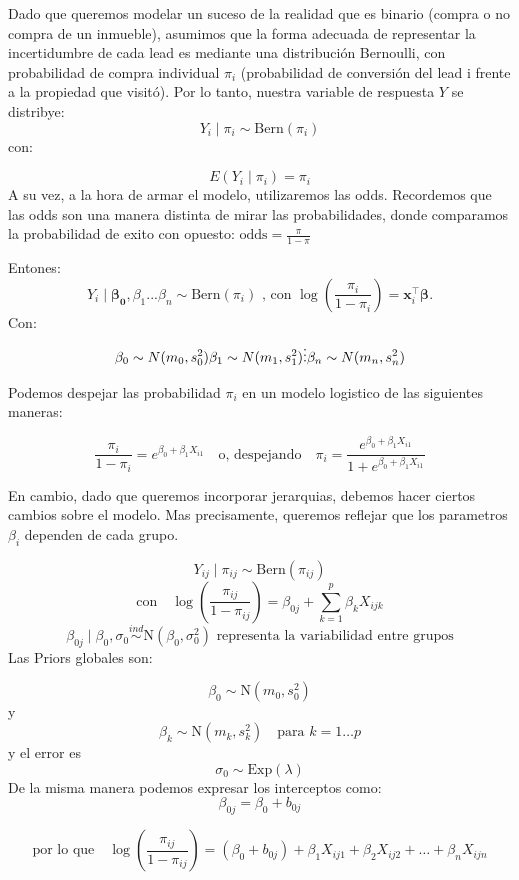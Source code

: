 \documentclass[
  letterpaper,
  DIV=11,
  numbers=noendperiod]{scrartcl}
\begin{document}
Dado que queremos modelar un suceso de la realidad que es binario
(compra o no compra de un inmueble), asumimos que la forma adecuada de
representar la incertidumbre de cada lead es mediante una distribución
Bernoulli, con probabilidad de compra individual \(\pi_i\) (probabilidad
de conversión del lead i frente a la propiedad que visitó). Por lo
tanto, nuestra variable de respuesta \(Y\) se distribye:
\[Y_i \mid \pi_i \sim \text{Bern}(\pi_i)\] con:

\[E(Y_i \mid \pi_i) = \pi_i\] A su vez, a la hora de armar el modelo,
utilizaremos las odds. Recordemos que las odds son una manera distinta
de mirar las probabilidades, donde comparamos la probabilidad de exito
con opuesto: \(\text{odds} = \frac{\pi}{1 - \pi}\)

Entones:
\[Y_i \mid \boldsymbol{\beta_0},{\beta_1}...{\beta_n} \sim \mathrm{Bern}(\pi_i)  \text{ ,  con } \log\!\left(\frac{\pi_i}{1-\pi_i}\right) = \mathbf{x}_i^\top \boldsymbol{\beta}.\]
Con: \[\beta_{0} \sim N(m_{0}, s_{0}^{2}) \\
\beta_{1} \sim N(m_{1}, s_{1}^{2}) \\
\vdots \\
\\
\beta_{n} \sim N(m_{n}, s_{n}^{2})\]

Podemos despejar las probabilidad \(\pi_i\) en un modelo logistico de
las siguientes maneras:

\[\frac{\pi_i}{1 - \pi_i} = e^{\beta_0 + \beta_1 X_{i1}} \quad\text{o, despejando}\quad \pi_i = \frac{e^{\beta_0 + \beta_1 X_{i1}}}{1 + e^{\beta_0 + \beta_1 X_{i1}}}\]

En cambio, dado que queremos incorporar jerarquias, debemos hacer
ciertos cambios sobre el modelo. Mas precisamente, queremos reflejar que
los parametros \(\beta_i\) dependen de cada grupo.

\[Y_{ij} \mid \pi_{ij} \sim \mathrm{Bern}(\pi_{ij})\]
\[\text{con} \quad \log\!\left(\frac{\pi_{ij}}{1 - \pi_{ij}}\right) = \beta_{0j} + \sum_{k=1}^{p} \beta_k X_{ijk}\]
\[\beta_{0j} \mid \beta_0, \sigma_0 \overset{ind}{\sim} \mathrm{N}(\beta_0, \sigma_0^2) \text{ representa la variabilidad entre grupos}\]
Las Priors globales son:

\[\beta_0 \sim \mathrm{N}(m_0, s_0^2)\] y
\[\beta_k \sim \mathrm{N}(m_k, s_k^2)\quad \text{para } k=1\dots p\] y
el error es \[\sigma_0 \sim \text{Exp}(\lambda)\] De la misma manera
podemos expresar los interceptos como: \[\beta_{0j} = \beta_0 + b_{0j}\]

\[\text{por lo que} \quad \log\!\left(\frac{\pi_{ij}}{1 - \pi_{ij}}\right)
= (\beta_0 + b_{0j}) + \beta_1 X_{ij1} + \beta_2 X_{ij2} + \dots+ \beta_n X_{ijn}\]
\end{document}
